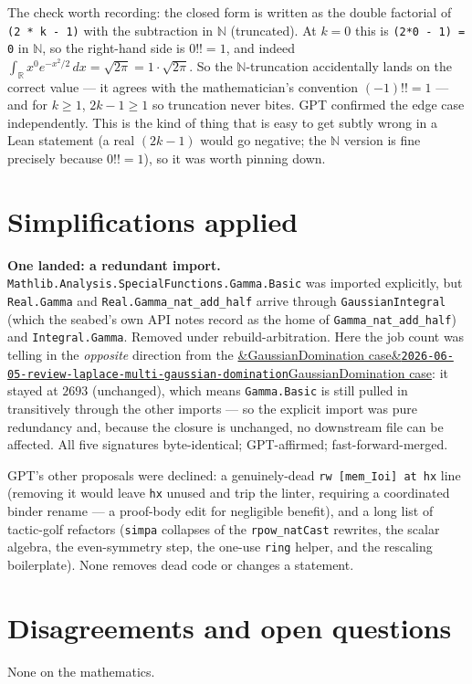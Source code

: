 \documentclass[11pt]{article}
\newcommand{\reviewref}[2][]{\href{https://therisensea.org/reviews/#2/}{\ifx&#1&\texttt{#2}\else#1\fi}}
\begin{document}
The check worth recording: the closed form is written as the double factorial of \texttt{(2 * k - 1)} with the
subtraction in $\mathbb N$ (truncated). At $k=0$ this is \texttt{(2*0 - 1) = 0} in $\mathbb N$, so the
right-hand side is $0!!=1$, and indeed $\int_{\mathbb R}x^0e^{-x^2/2}\,dx=\sqrt{2\pi}=1\cdot\sqrt{2\pi}$. So the
$\mathbb N$-truncation accidentally lands on the correct value --- it agrees with the mathematician's
convention $(-1)!!=1$ --- and for $k\ge1$, $2k-1\ge1$ so truncation never bites. GPT confirmed the edge case
independently. This is the kind of thing that is easy to get subtly wrong in a Lean statement (a real
$(2k-1)$ would go negative; the $\mathbb N$ version is fine precisely because $0!!=1$), so it was worth pinning
down.

\section{Simplifications applied}
\textbf{One landed: a redundant import.} \texttt{Mathlib.Analysis.SpecialFunctions.Gamma.Basic} was imported
explicitly, but \texttt{Real.Gamma} and \texttt{Real.Gamma\_nat\_add\_half} arrive through
\texttt{GaussianIntegral} (which the seabed's own API notes record as the home of
\texttt{Gamma\_nat\_add\_half}) and \texttt{Integral.Gamma}. Removed under rebuild-arbitration. Here the job
count was telling in the \emph{opposite} direction from the \reviewref[GaussianDomination
case]{2026-06-05-review-laplace-multi-gaussian-domination}: it stayed at $2693$ (unchanged), which means
\texttt{Gamma.Basic} is still pulled in transitively through the other imports --- so the explicit import was
pure redundancy and, because the closure is unchanged, no downstream file can be affected. All five signatures
byte-identical; GPT-affirmed; fast-forward-merged.

GPT's other proposals were declined: a genuinely-dead \texttt{rw [mem\_Ioi] at hx} line (removing it would
leave \texttt{hx} unused and trip the linter, requiring a coordinated binder rename --- a proof-body edit for
negligible benefit), and a long list of tactic-golf refactors (\texttt{simpa} collapses of the
\texttt{rpow\_natCast} rewrites, the scalar algebra, the even-symmetry step, the one-use \texttt{ring} helper,
and the rescaling boilerplate). None removes dead code or changes a statement.

\section{Disagreements and open questions}
None on the mathematics.
\end{document}
